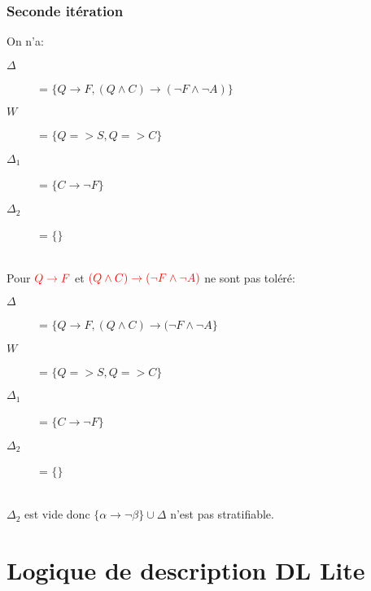 \subsection{Seconde itération}
On n'a:
\begin{description}
\item[$\Delta$] = $\{ Q \rightarrow F, (Q \wedge C) \rightarrow (\neg F \wedge \neg A) \}$
\item[$W$] = $\{ Q => S, Q => C\}$
\item[$\Delta_1$] = $\{ C \rightarrow \neg F \}$
\item[$\Delta_2$] = $\{ \}$
\end{description}
\ \\
Pour $\textcolor{red}{ Q \rightarrow F }$ et $\textcolor{red}{ ( Q \wedge C) \rightarrow (\neg F \wedge \neg A) }$ ne sont pas toléré:
\begin{description}
\item[$\Delta$] = $\{ Q \rightarrow F, (Q \wedge C) \rightarrow (\neg F \wedge \neg A \}$
\item[$W$] = $\{ Q => S, Q => C\}$
\item[$\Delta_1$] = $\{ C \rightarrow \neg F \}$
\item[$\Delta_2$] = $\{ \}$
\end{description}
\ \\
$\Delta_2$ est vide donc $\{\alpha \rightarrow \neg \beta \} \cup \Delta$ n'est pas stratifiable.

\chapter{Logique de description DL Lite}
